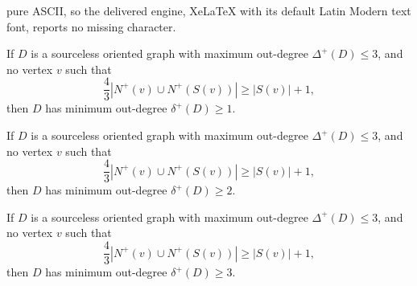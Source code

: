 \documentclass[10pt,a4paper]{amsart}
\begin{document}
pure ASCII, so the delivered engine, XeLaTeX with its default Latin Modern text font, reports no missing character.
\begin{lemma}\label{Lemma: out-3, min-0}
   If $D$ is a sourceless oriented graph with maximum out-degree $\Delta^+(D)\leq 3$,
   and no vertex $v$ such that 
    \[
    \frac{4}{3}|N^+(v) \cup N^+(S(v))| \geq |S(v)|+1,
    \]
    then $D$ has minimum out-degree $\delta^+(D)\geq 1$.
\end{lemma}

\begin{lemma}\label{Lemma: out-3, min-1}
   If $D$ is a sourceless oriented graph with maximum out-degree $\Delta^+(D)\leq 3$,
   and no vertex $v$ such that
    \[
    \frac{4}{3}|N^+(v) \cup N^+(S(v))| \geq |S(v)|+1,
    \]
    then $D$ has minimum out-degree $\delta^+(D)\geq 2$.
\end{lemma}

\begin{lemma}\label{Lemma: out-3, min-2}
   If $D$ is a sourceless oriented graph with maximum out-degree $\Delta^+(D)\leq 3$,
   and no vertex $v$ such that
    \[
    \frac{4}{3}|N^+(v) \cup N^+(S(v))| \geq |S(v)|+1,
    \]
    then $D$ has minimum out-degree $\delta^+(D)\geq 3$.
\end{lemma}
\end{document}
